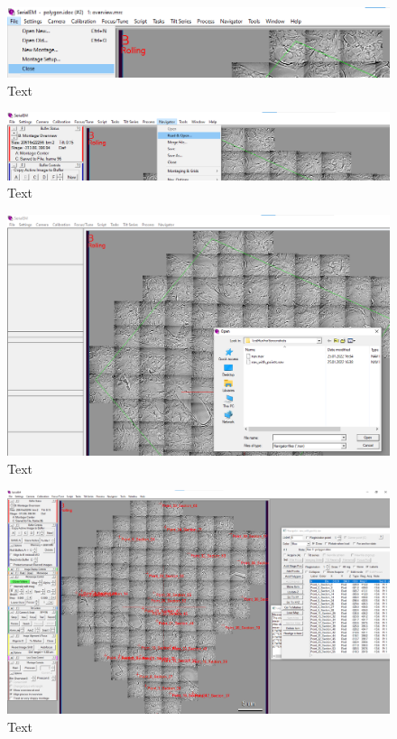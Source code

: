 \documentclass[12pt, a4paper]{scrartcl}
\begin{document}
\begin{figure}[H]
\includegraphics[width=\linewidth]{screenshots/File_Close.png}
\caption{Text}
\end{figure}

\begin{figure}[H]
\includegraphics[width=\linewidth]{screenshots/NavigatorReadAndOpen.png}
\caption{Text}
\end{figure}


\begin{figure}[H]
\includegraphics[width=\linewidth]{screenshots/OpenNavWithPoints.png}
\caption{Text}
\end{figure}

\begin{figure}[H]
\includegraphics[width=\linewidth]{screenshots/MapWithPoints.png}
\caption{Text}
\end{figure}
\end{document}

